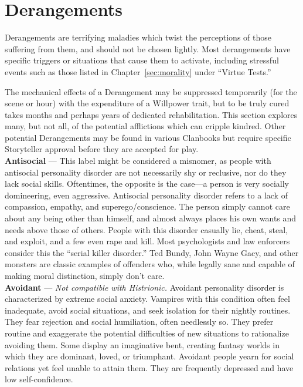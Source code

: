 \section{Derangements}
\label{sec:derangements}
Derangements are terrifying maladies which twist the perceptions of those suffering from them, 
and should not be chosen lightly.  Most derangements have specific triggers or situations that 
cause them to activate, including stressful events such as those listed in Chapter~\ref{sec:morality} 
under ``Virtue Tests.''

The mechanical effects of a Derangement may be suppressed temporarily (for the scene or hour) 
with the expenditure of a Willpower trait, but to be truly cured takes months and perhaps years 
of dedicated rehabilitation.  This section explores many, but not all, of the potential 
afflictions which can cripple kindred.  Other potential Derangements may be found in various 
Clanbooks but require specific Storyteller approval before they are accepted for play.  \\

\textbf{Antisocial} --- This label might be considered a misnomer, as people with antisocial personality disorder are not necessarily shy or reclusive, nor do they lack social skills.  Oftentimes, the opposite is the case---a person is very socially domineering, even aggressive.  Antisocial personality disorder refers to a lack of compassion, empathy, and superego/conscience.  The person simply cannot care about any being other than himself, and almost always places his own wants and needs above those of others.  People with this disorder casually lie, cheat, steal, and exploit, and a few even rape and kill.  Most psychologists and law enforcers consider this the ``serial killer disorder.'' Ted Bundy, John Wayne Gacy, and other monsters are classic examples of offenders who, while legally sane and capable of making moral distinction, simply don't care. \\

\textbf{Avoidant} --- \emph{Not compatible with Histrionic.} Avoidant personality disorder is characterized by extreme social anxiety.  Vampires with this condition often feel inadequate, avoid social situations, and seek isolation for their nightly routines.  They fear rejection and social humiliation, often needlessly so.  They prefer routine and exaggerate the potential difficulties of new situations to rationalize avoiding them.  Some display an imaginative bent, creating fantasy worlds in which they are dominant, loved, or triumphant.  Avoidant people yearn for social relations yet feel unable to attain them.  They are frequently depressed and have low self-confidence. \\


